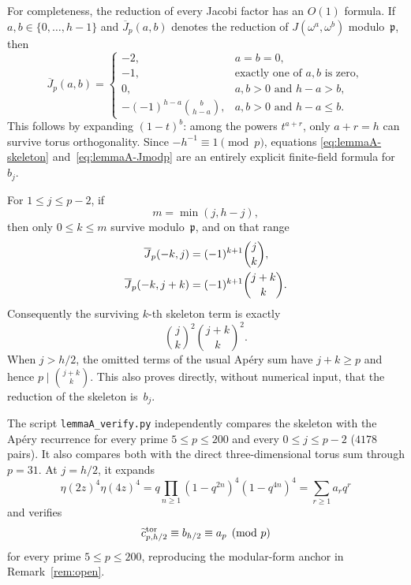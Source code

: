 For completeness, the reduction of every Jacobi factor has an
$O(1)$ formula.  If $a,b\in\{0,\ldots,h-1\}$ and
$\overline J_p(a,b)$ denotes the reduction of
$J(\omega^a,\omega^b)$ modulo~$\mathfrak p$, then
\begin{equation}
 \overline J_p(a,b)=
 \begin{cases}
 -2,&a=b=0,\\
 -1,&\text{exactly one of $a,b$ is zero},\\
 0,&a,b>0\text{ and }h-a>b,\\
 -(-1)^{h-a}\binom b{h-a},
      &a,b>0\text{ and }h-a\leq b.
 \end{cases}
 \label{eq:lemmaA-Jmodp}
\end{equation}
This follows by expanding $(1-t)^b$: among the powers $t^{a+r}$,
only $a+r=h$ can survive torus orthogonality.  Since
$-h^{-1}\equiv1\pmod p$, equations
\eqref{eq:lemmaA-skeleton} and~\eqref{eq:lemmaA-Jmodp} are an entirely
explicit finite-field formula for~$b_j$.

For $1\leq j\leq p-2$, if
\[
 m=\min(j,h-j),
\]
then only $0\leq k\leq m$ survive modulo~$\mathfrak p$, and on that
range
\begin{align}
 \overline J_p(-k,j)&=(-1)^{k+1}\binom jk,\notag\\
 \overline J_p(-k,j+k)&=(-1)^{k+1}\binom{j+k}k.
 \label{eq:lemmaA-unit-reduction}
\end{align}
Consequently the surviving $k$-th skeleton term is exactly
\begin{equation}
 \binom jk^2\binom{j+k}k^2.
 \label{eq:lemmaA-Apery-summand}
\end{equation}
When $j>h/2$, the omitted terms of the usual Ap\'ery sum have
$j+k\geq p$ and hence $p\mid\binom{j+k}k$.  This also proves directly,
without numerical input, that the reduction of the skeleton is~$b_j$.

The script \texttt{lemmaA\_verify.py} independently compares the
skeleton with the Ap\'ery recurrence for every prime $5\leq p\leq200$
and every $0\leq j\leq p-2$ ($4178$ pairs).  It also compares both with
the direct three-dimensional torus sum through $p=31$.  At
$j=h/2$, it expands
\[
 \eta(2z)^4\eta(4z)^4
 =q\prod_{n\geq1}(1-q^{2n})^4(1-q^{4n})^4
 =\sum_{r\geq1}a_rq^r
\]
and verifies
\begin{equation}
 \widetilde c_{p,h/2}^{\rm tor}\equiv b_{h/2}\equiv a_p\pmod p
 \label{eq:lemmaA-midpoint-anchor}
\end{equation}
for every prime $5\leq p\leq200$, reproducing the modular-form anchor
in Remark~\ref{rem:open}.

